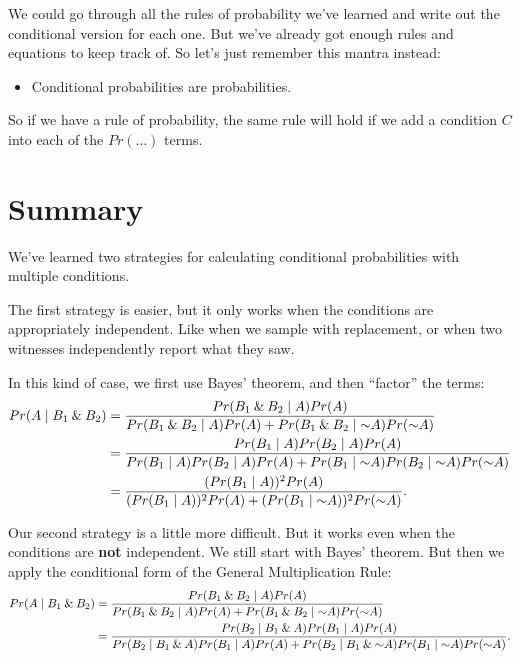 \documentclass[justified]{tufte-book}
\newcommand{\given}{\mid}
\renewcommand{\neg}{\mathbin{\sim}}
\renewcommand{\wedge}{\mathbin{\&}}
\newcommand{\p}{Pr}
\newenvironment{info}{\begin{itemize}\item[\Info]}{\end{itemize}}
\theoremstyle{definition}
\theoremstyle{definition}
\theoremstyle{definition}
\theoremstyle{definition}
\theoremstyle{remark}
\begin{document}
We could go through all the rules of probability we've learned and write out the conditional version for each one. But we've already got enough rules and equations to keep track of. So let's just remember this mantra instead:

\begin{info}
Conditional probabilities are probabilities.
\end{info}

So if we have a rule of probability, the same rule will hold if we add a condition \(C\) into each of the \(\p(\ldots)\) terms.

\hypertarget{summary-2}{%
\section{Summary}\label{summary-2}}

We've learned two strategies for calculating conditional probabilities with multiple conditions.

The first strategy is easier, but it only works when the conditions are appropriately independent. Like when we sample with replacement, or when two witnesses independently report what they saw.

In this kind of case, we first use Bayes' theorem, and then ``factor'' the terms:
\[
  \begin{aligned}
    \p(A \given B_1 \wedge B_2) &= 
      \frac{\p(B_1 \wedge B_2 \given A)\p(A)}{%
            \p(B_1 \wedge B_2 \given A)\p(A) +%
              \p(B_1 \wedge B_2 \given \neg A)\p(\neg A)}\\
      &= \frac{\p(B_1 \given A)\p(B_2 \given A)\p(A)}{%
                \p(B_1 \given A)\p(B_2 \given A)\p(A) +%
                  \p(B_1 \given \neg A)\p(B_2 \given \neg A)\p(\neg A)}\\
      &= \frac{(\p(B_1 \given A))^2\p(A)}{%
                (\p(B_1 \given A))^2\p(A) +%
                  (\p(B_1 \given \neg A))^2\p(\neg A)}.
  \end{aligned}
\]

Our second strategy is a little more difficult. But it works even when the conditions are \textbf{not} independent. We still start with Bayes' theorem. But then we apply the conditional form of the General Multiplication Rule:
\[
  \begin{aligned}
    \p(A \given B_1 \wedge B_2) &= 
      \frac{\p(B_1 \wedge B_2 \given A)\p(A)}{%
            \p(B_1 \wedge B_2 \given A)\p(A) +%
              \p(B_1 \wedge B_2 \given \neg A)\p(\neg A)}\\
      &= \frac{\p(B_2 \given B_1 \wedge A)\p(B_1 \given A)\p(A)}{%
                \p(B_2 \given B_1 \wedge A)\p(B_1 \given A)\p(A) +%
                  \p(B_2 \given B_1 \wedge \neg A)\p(B_1 \given \neg A)\p(\neg A)}.
  \end{aligned}
\]
\end{document}
